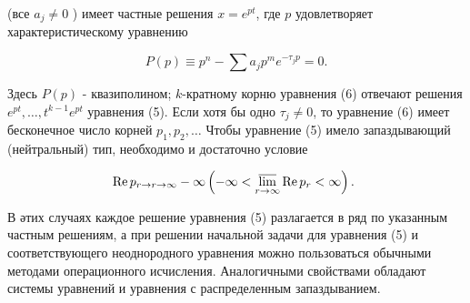 \documentclass[10pt]{article}
\begin{document}
(все $a_{j} \neq 0$ ) имеет частные решения $x=e^{p t}$, где $p$ удовлетворяет характеристическому уравнению



\[

P(p) \equiv p^{n}-\sum a_{j} p^{m} e^{-\tau_{j} p}=0 .

\]



Здесь $P(p)$ - квазиполином; $k$-кратному корню уравнения (6) отвечают решения $e^{p t}, \ldots, t^{k-1} e^{p t}$ уравнения (5). Если хотя бы одно $\tau_{j} \neq 0$, то уравнение (6) имеет бесконечное число корней $p_{1}, p_{2}, \ldots$ Чтобы уравнение (5) имело запаздывающий (нейтральный) тип, необходимо и достаточно условие



\[

\operatorname{Re} p_{r \rightarrow r \rightarrow \infty}-\infty\left(-\infty<\varlimsup_{r \rightarrow \infty} \operatorname{Re} p_{r}<\infty\right) \text {. }

\]



В әтих случаях каждое решение уравнения (5) разлагается в ряд по указанным частным решениям, а при решении начальной задачи для уравнения (5) и соответствующего неоднородного уравнения можно пользоваться обычными методами операционного исчисления. Аналогичными свойствами обладают системы уравнений и уравнения с распределенным запаздыванием.
\end{document}
